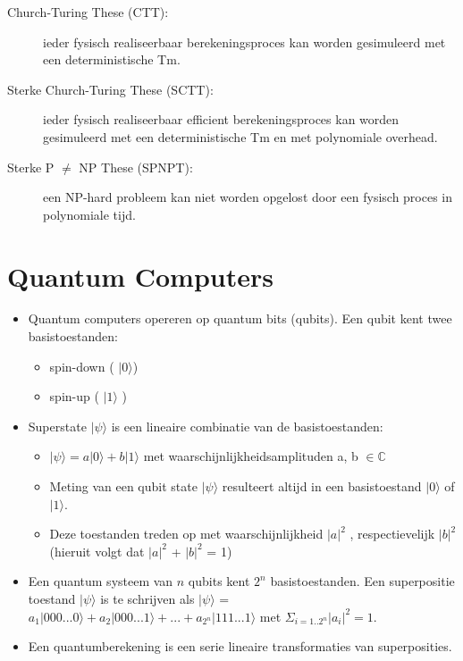 \documentclass[]{article}
\begin{document}
\begin{description}
\item[Church-Turing These (CTT):] ieder fysisch realiseerbaar berekeningsproces kan worden gesimuleerd met een deterministische Tm.
\item[Sterke Church-Turing These (SCTT):] ieder fysisch realiseerbaar efficient berekeningsproces kan worden gesimuleerd met een deterministische Tm en met polynomiale overhead.
\item[Sterke P $\not=$ NP These (SPNPT):] een NP-hard probleem kan niet worden opgelost door een fysisch proces in polynomiale tijd.
\end{description}

\section*{Quantum Computers}

\begin{itemize}
\item Quantum computers opereren op quantum bits (qubits). Een qubit kent twee basistoestanden:
\begin{itemize}
\item spin-down ( $|0\rangle$)
\item spin-up ( $|1\rangle$ )
\end{itemize}
\item Superstate $|\psi\rangle$ is een lineaire combinatie van de basistoestanden:
\begin{itemize}
\item $|\psi\rangle = a |0\rangle + b|1\rangle$ met waarschijnlijkheidsamplituden a, b $\in \mathbb{C}$
\item Meting van een qubit state $|\psi\rangle$ resulteert altijd in een basistoestand $|0\rangle$ of $|1\rangle$.
\item Deze toestanden treden op met waarschijnlijkheid $|a|^2$ , respectievelijk $|b|^2$ \\
(hieruit volgt dat $|a|^2$ + $|b|^2$ = 1)
\end{itemize}
\item Een quantum systeem van $n$ qubits kent $2^n$ basistoestanden. Een superpositie toestand $|\psi\rangle$ is te schrijven als $|\psi\rangle$ = $a_1|000...0\rangle + a_2|000...1\rangle + ... + a_{2^n}|111...1\rangle$ met $\Sigma_{i=1..2^n} |a_i|^2 = 1$.
\item Een quantumberekening is een serie lineaire transformaties van superposities.
\end{itemize}
\end{document}
